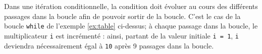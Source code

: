 Dans une itération conditionnelle, la condition doit évoluer au cours des différents passages
dans la boucle afin de pouvoir sortir de la boucle. C'est le cas de la boucle {\tt while}
de l'exemple \ref{ex:table} ci-dessus; à chaque passage dans la boucle, le
multiplicateur {\tt i} est incrémenté : ainsi, partant de la valeur initiale {\tt i = 1},
{\tt i} deviendra nécessairement égal à {\tt 10} après 9 passages dans la boucle.

